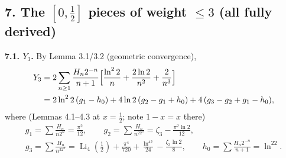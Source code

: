 \documentclass[11pt]{article}
\theoremstyle{remark}
\begin{document}
\subsection*{7. The $[0,\tfrac12]$ pieces of weight $\le3$ (all fully derived)}

\textbf{7.1. $Y_3$.} By Lemma 3.1/3.2 (geometric convergence),
\[
\begin{aligned}
Y_3&=2\sum_{n\ge1}\frac{H_n2^{-n}}{n+1}\Bigl[\frac{\ln^22}{n}+\frac{2\ln2}{n^2}+\frac{2}{n^3}\Bigr]\\
&=2\ln^22\,(g_1-h_0)+4\ln2\,(g_2-g_1+h_0)+4\,(g_3-g_2+g_1-h_0),
\end{aligned}
\]
where (Lemmas 4.1--4.3 at $x=\tfrac12$; note $1-x=x$ there)
\[
\begin{gathered}
g_1=\sum\frac{H_n}{n2^n}=\frac{\pi^2}{12},\qquad
g_2=\sum\frac{H_n}{n^22^n}=\zeta_3-\frac{\pi^2\ln2}{12},\\
g_3=\sum\frac{H_n}{n^32^n}=\operatorname{Li}_4(\tfrac12)+\frac{\pi^4}{720}+\frac{\ln^42}{24}-\frac{\zeta_3\ln2}{8},\qquad
h_0=\sum\frac{H_n2^{-n}}{n+1}=\ln^22 .
\end{gathered}
\]
\end{document}
